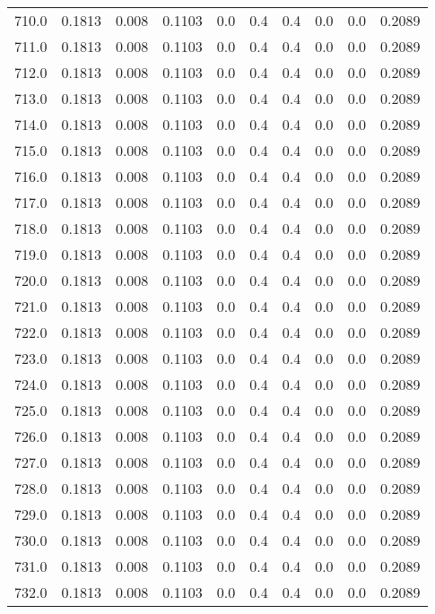 \begin{longtable}{lrrrrrrrrr}
710.0 & 0.1813 & 0.008 & 0.1103 & 0.0 & 0.4 & 0.4 & 0.0 & 0.0 & 0.2089 \\
711.0 & 0.1813 & 0.008 & 0.1103 & 0.0 & 0.4 & 0.4 & 0.0 & 0.0 & 0.2089 \\
712.0 & 0.1813 & 0.008 & 0.1103 & 0.0 & 0.4 & 0.4 & 0.0 & 0.0 & 0.2089 \\
713.0 & 0.1813 & 0.008 & 0.1103 & 0.0 & 0.4 & 0.4 & 0.0 & 0.0 & 0.2089 \\
714.0 & 0.1813 & 0.008 & 0.1103 & 0.0 & 0.4 & 0.4 & 0.0 & 0.0 & 0.2089 \\
715.0 & 0.1813 & 0.008 & 0.1103 & 0.0 & 0.4 & 0.4 & 0.0 & 0.0 & 0.2089 \\
716.0 & 0.1813 & 0.008 & 0.1103 & 0.0 & 0.4 & 0.4 & 0.0 & 0.0 & 0.2089 \\
717.0 & 0.1813 & 0.008 & 0.1103 & 0.0 & 0.4 & 0.4 & 0.0 & 0.0 & 0.2089 \\
718.0 & 0.1813 & 0.008 & 0.1103 & 0.0 & 0.4 & 0.4 & 0.0 & 0.0 & 0.2089 \\
719.0 & 0.1813 & 0.008 & 0.1103 & 0.0 & 0.4 & 0.4 & 0.0 & 0.0 & 0.2089 \\
720.0 & 0.1813 & 0.008 & 0.1103 & 0.0 & 0.4 & 0.4 & 0.0 & 0.0 & 0.2089 \\
721.0 & 0.1813 & 0.008 & 0.1103 & 0.0 & 0.4 & 0.4 & 0.0 & 0.0 & 0.2089 \\
722.0 & 0.1813 & 0.008 & 0.1103 & 0.0 & 0.4 & 0.4 & 0.0 & 0.0 & 0.2089 \\
723.0 & 0.1813 & 0.008 & 0.1103 & 0.0 & 0.4 & 0.4 & 0.0 & 0.0 & 0.2089 \\
724.0 & 0.1813 & 0.008 & 0.1103 & 0.0 & 0.4 & 0.4 & 0.0 & 0.0 & 0.2089 \\
725.0 & 0.1813 & 0.008 & 0.1103 & 0.0 & 0.4 & 0.4 & 0.0 & 0.0 & 0.2089 \\
726.0 & 0.1813 & 0.008 & 0.1103 & 0.0 & 0.4 & 0.4 & 0.0 & 0.0 & 0.2089 \\
727.0 & 0.1813 & 0.008 & 0.1103 & 0.0 & 0.4 & 0.4 & 0.0 & 0.0 & 0.2089 \\
728.0 & 0.1813 & 0.008 & 0.1103 & 0.0 & 0.4 & 0.4 & 0.0 & 0.0 & 0.2089 \\
729.0 & 0.1813 & 0.008 & 0.1103 & 0.0 & 0.4 & 0.4 & 0.0 & 0.0 & 0.2089 \\
730.0 & 0.1813 & 0.008 & 0.1103 & 0.0 & 0.4 & 0.4 & 0.0 & 0.0 & 0.2089 \\
731.0 & 0.1813 & 0.008 & 0.1103 & 0.0 & 0.4 & 0.4 & 0.0 & 0.0 & 0.2089 \\
732.0 & 0.1813 & 0.008 & 0.1103 & 0.0 & 0.4 & 0.4 & 0.0 & 0.0 & 0.2089 \\

\end{longtable}
